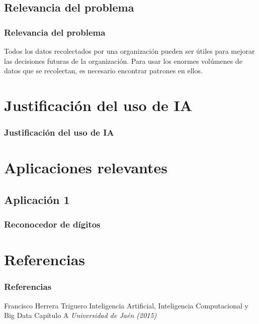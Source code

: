 \documentclass{beamer}
\begin{document}
\subsection{Relevancia del problema}
  \begin{frame}
    \frametitle{Relevancia del problema}
    
    Todos los datos recolectados por una organización pueden ser útiles para
    mejorar las decisiones futuras de la organización. Para usar los enormes
    volúmenes de datos que se recolectan, es necesario encontrar patrones en
    ellos.
    
  \end{frame}
  

\section{Justificación del uso de IA}
  \begin{frame}
    \frametitle{Justificación del uso de IA}
  \end{frame}

\section{Aplicaciones relevantes}
  \subsection{Aplicación 1}
    \begin{frame}
      \frametitle{Reconocedor de dígitos}
    \end{frame}


\section {Referencias}
\begin{frame}
\frametitle{Referencias}
\footnotesize{
  \begin{thebibliography}{99} %
     Francisco Herrera Triguero
      \newblock Inteligencia Artificial, Inteligencia Computacional y Big Data
      \newblock Capítulo A
      \newblock \emph{Universidad de Jaén (2015)}
  \end{thebibliography}
}
\end{frame}
\end{document}
